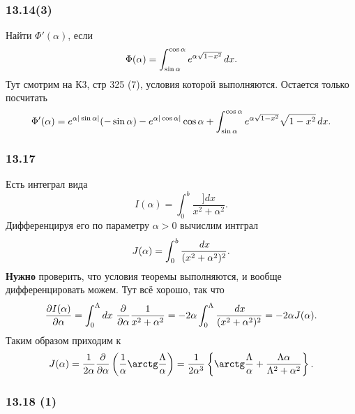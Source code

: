 \subsubsection{13.14(3)}

Найти $\Phi'(\alpha)$, если 
\begin{equation*}
    \Phi(\alpha) = \int_{\sin \alpha}^{\cos \alpha} e^{\alpha\sqrt{1-x^2}} \, d x.
\end{equation*}
Тут смотрим на К3, стр 325 (7), условия которой выполняются. Остается только посчитать
\begin{equation*}
    \Phi'(\alpha) = e^{\alpha |\sin \alpha|} (-\sin \alpha) - e^{\alpha |\cos \alpha|} \cos \alpha + \int_{\sin \alpha}^{\cos \alpha} e^{\alpha \sqrt{1-x^2}} \sqrt{1-x^2} \, d x.
\end{equation*}


\subsubsection{13.17}

Есть интеграл вида
\begin{equation*}
    I(\alpha) = \int_0^b \frac{]d x}{x^2 + \alpha^2}.
\end{equation*}
Дифференцируя его по параметру $\alpha > 0$ вычислим интграл
\begin{equation*}
    J(\alpha) = \int_0^b \frac{\, d x}{(x^2 + \alpha^2)^2}.
\end{equation*}
\textbf{Нужно} проверить, что условия теоремы выполняются, и вообще дифференцировать можем.
Тут всё хорошо, так что
\begin{equation*}
    \frac{\partial I(\alpha)}{\partial \alpha} = \int_0^\Lambda dx \ \frac{\partial }{\partial \alpha} \frac{1}{x^2+\alpha^2} = - 2 \alpha \int_0^\Lambda \frac{\, d x}{(x^2 + \alpha^2)^2} = - 2 \alpha J(\alpha).
\end{equation*}
Таким образом приходим к
\begin{equation*}
    J(\alpha) = \frac{1}{2\alpha} \frac{\partial }{\partial \alpha} \left(
        \frac{1}{\alpha} \arctg \frac{\Lambda}{\alpha}
    \right) = \frac{1}{2\alpha^3} \left\{
        \arctg \frac{\Lambda}{\alpha} + \frac{\Lambda \alpha}{\Lambda^2 + \alpha^2}
    \right\}.
\end{equation*}


\subsubsection*{13.18 (1)}

